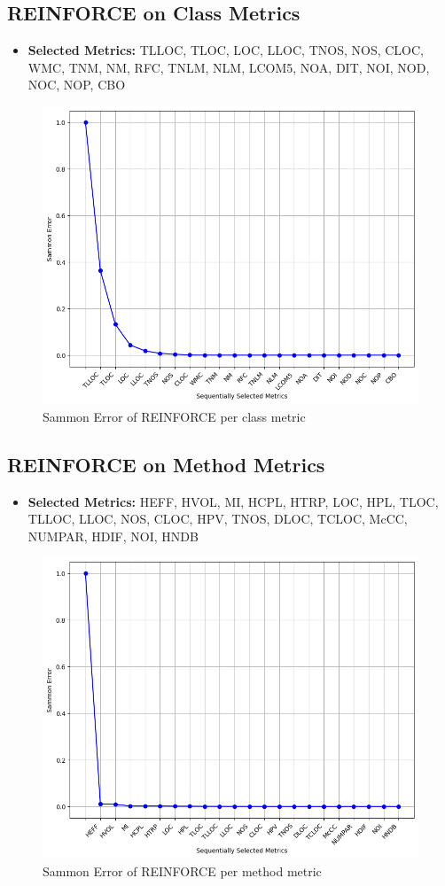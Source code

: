 \subsection*{REINFORCE on Class Metrics}
\begin{itemize}
    \item \textbf{Selected Metrics:} TLLOC, TLOC, LOC, LLOC, TNOS, NOS, CLOC, WMC, TNM, NM, RFC, TNLM, NLM, LCOM5, NOA, DIT, NOI, NOD, NOC, NOP, CBO
\end{itemize}

\begin{figure}[H]
    \centering
    \includegraphics[width=0.5\linewidth]{images/class-reinforce-named.png}
    \caption{Sammon Error of REINFORCE per class metric}
    \label{fig:class-reinforce-named}
\end{figure}

\subsection*{REINFORCE on Method Metrics}
\begin{itemize}
    \item \textbf{Selected Metrics:} HEFF, HVOL, MI, HCPL, HTRP, LOC, HPL, TLOC, TLLOC, LLOC, NOS, CLOC, HPV, TNOS, DLOC, TCLOC, McCC, NUMPAR, HDIF, NOI, HNDB
\end{itemize}

\begin{figure}[H]
    \centering
    \includegraphics[width=0.5\linewidth]{images/method-reinforce-named.png}
    \caption{Sammon Error of REINFORCE per method metric}
    \label{fig:class-reinforce-named}
\end{figure}